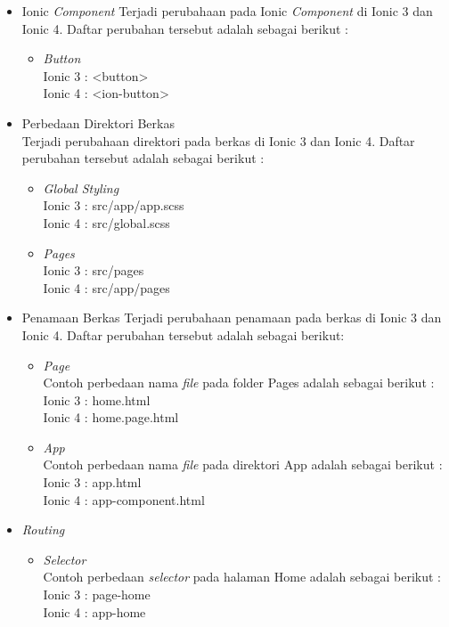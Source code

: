 \begin{enumerate}
\begin{enumerate}
\begin{itemize}
			\item Ionic {\it Component}
			Terjadi perubahaan pada Ionic {\it Component} di Ionic 3 dan Ionic 4. Daftar perubahan tersebut adalah sebagai berikut :
			\begin{itemize}
				\item {\it Button} \\
				Ionic 3 : <button>  \\
				Ionic 4 : <ion-button>
			\end{itemize}
	
			\item Perbedaan Direktori Berkas \\
			Terjadi perubahaan direktori pada berkas di Ionic 3 dan Ionic 4. Daftar perubahan tersebut adalah sebagai berikut :
			\begin{itemize}
				\item {\it Global Styling} \\
				Ionic 3 : src/app/app.scss \\
				Ionic 4 : src/global.scss

				\item {\it Pages} \\
				Ionic 3 : src/pages  \\
				Ionic 4 : src/app/pages
			\end{itemize}
	
			\item Penamaan Berkas
			Terjadi perubahaan penamaan pada berkas di Ionic 3 dan Ionic 4. Daftar perubahan tersebut adalah sebagai berikut:
			\begin{itemize}
				\item {\it Page} \\
				Contoh perbedaan nama {\it file} pada folder Pages adalah sebagai berikut :\\
				Ionic 3 : home.html  \\
				Ionic 4 : home.page.html
	
				\item {\it App} \\
				Contoh perbedaan nama {\it file} pada direktori App adalah sebagai berikut : \\
				Ionic 3 : app.html \\
				Ionic 4 : app-component.html
			\end{itemize}

			\item {\it Routing}
			\begin{itemize}
				\item {\it Selector} \\
				Contoh perbedaan {\it selector} pada halaman Home adalah sebagai berikut :\\
				Ionic 3 : page-home  \\
				Ionic 4 : app-home
			\end{itemize}
			

\end{itemize}
\end{enumerate}
\end{enumerate}
